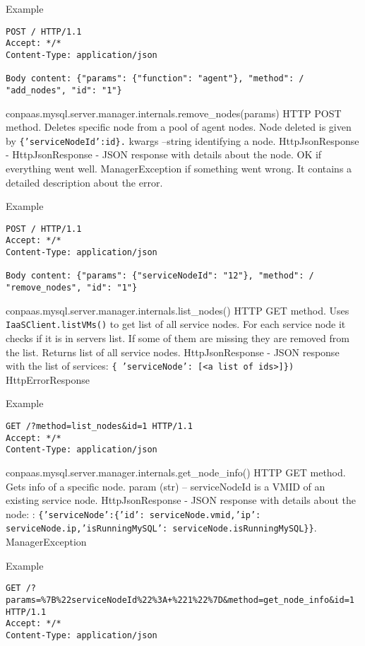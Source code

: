 \documentclass[a4paper,10pt]{article}
\begin{document}
Example
\begin{Verbatim}[frame=single]
POST / HTTP/1.1
Accept: */*
Content-Type: application/json

Body content: {"params": {"function": "agent"}, "method": /
"add_nodes", "id": "1"}
\end{Verbatim}

\noindent\conapi
{ conpaas.mysql.server.manager.internals.remove\_nodes(params)}
{HTTP POST method. Deletes specific node from a pool of agent nodes. Node deleted is given by {\tt \{'serviceNodeId':id\}.}}
{kwargs --string identifying a node.}
{HttpJsonResponse - HttpJsonResponse - JSON response with details about the node. OK if everything went well. }
{ManagerException if something went wrong. It contains a detailed description about the error.}

Example
\begin{Verbatim}[frame=single]
POST / HTTP/1.1
Accept: */*
Content-Type: application/json

Body content: {"params": {"serviceNodeId": "12"}, "method": /
"remove_nodes", "id": "1"}
\end{Verbatim}

\noindent\conapi
{ conpaas.mysql.server.manager.internals.list\_nodes()}
{ HTTP GET method. Uses {\tt IaaSClient.listVMs()} to get list of all service nodes. For each service node it checks if it is in servers list. If some of them are missing they are removed from the list. Returns list of all service nodes.}
{}
{HttpJsonResponse - JSON response with the list of services: {\tt \{ 'serviceNode': [<a list of ids>]\})}}
{HttpErrorResponse}

Example
\begin{Verbatim}[frame=single]
GET /?method=list_nodes&id=1 HTTP/1.1
Accept: */*
Content-Type: application/json
\end{Verbatim}

\noindent\conapi
{ conpaas.mysql.server.manager.internals.get\_node\_info()}
{HTTP GET method. Gets info of a specific node.}
{param (str) -- serviceNodeId is a VMID of an existing service node.}
{HttpJsonResponse - JSON response with details about the node: : {\tt \{'serviceNode':\{'id': serviceNode.vmid,'ip': serviceNode.ip,'isRunningMySQL': serviceNode.isRunningMySQL\}\}}.}
{ManagerException}

Example
\begin{Verbatim}[frame=single]
GET /?params=%7B%22serviceNodeId%22%3A+%221%22%7D&method=get_node_info&id=1 HTTP/1.1
Accept: */*
Content-Type: application/json
\end{Verbatim}
\end{document}
